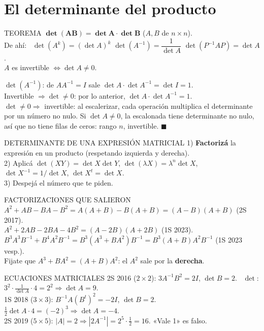 \section{El determinante del producto}
\begin{sello}{TEOREMA}
$\boldsymbol{\det(AB)=\det A\cdot\det B}$ \quad ($A,B$ de $n\times n$).\\[3pt]
De ahí: \ $\det(A^k)=(\det A)^k$ \quad $\det(A^{-1})=\dfrac1{\det A}$ \quad $\det(P^{-1}AP)=\det A$.\\[3pt]
$A$ es invertible $\iff\det A\neq0$.
\end{sello}
\begin{demo}
$\det(A^{-1})$: de $AA^{-1}=I$ sale $\det A\cdot\det A^{-1}=\det I=1$.\\
Invertible $\Rightarrow\det\neq0$: por lo anterior, $\det A\cdot\det A^{-1}=1$.\\
$\det\neq0\Rightarrow$ invertible: al escalerizar, cada operación multiplica el determinante por un número no nulo. Si $\det A\neq0$, la escalonada tiene determinante no nulo, así que no tiene filas de ceros: rango $n$, invertible. $\blacksquare$
\end{demo}
\begin{metodo}{DETERMINANTE DE UNA EXPRESIÓN MATRICIAL}
1) \textbf{Factorizá} la expresión en un producto (respetando izquierda y derecha).\\
2) Aplicá $\det(XY)=\det X\det Y$, $\det(\lambda X)=\lambda^n\det X$, $\det X^{-1}=1/\det X$, $\det X^t=\det X$.\\
3) Despejá el número que te piden.
\end{metodo}
\begin{memo}{FACTORIZACIONES QUE SALIERON}
$A^2+AB-BA-B^2=A(A+B)-B(A+B)=(A-B)(A+B)$ \quad (2S 2017).\\
$A^2+2AB-2BA-4B^2=(A-2B)(A+2B)$ \quad (1S 2023).\\
$B^3A^3B^{-1}+B^4A^2B^{-1}=B^3(A^3+BA^2)B^{-1}=B^3(A+B)A^2B^{-1}$ \quad (1S 2023 vesp.).\\
Fijate que $A^3+BA^2=(A+B)A^2$: el $A^2$ sale por la \textbf{derecha}.
\end{memo}
\begin{memo}{ECUACIONES MATRICIALES}
2S 2016 ($2\times2$): $3A^{-1}B^2=2I$, $\det B=2$. \ $\det$: $3^2\cdot\frac1{\det A}\cdot4=2^2\Rightarrow\det A=9$.\\
1S 2018 ($3\times3$): $B^{-1}A(B^t)^2=-2I$, $\det B=2$. \ $\frac12\det A\cdot4=(-2)^3\Rightarrow\det A=-4$.\\
2S 2019 ($5\times5$): $|A|=2\Rightarrow|2A^{-1}|=2^5\cdot\frac12=16$. «Vale 1» es falso.
\end{memo}

